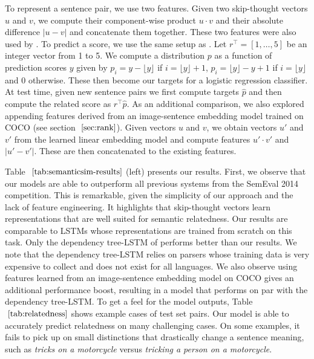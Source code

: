 \documentclass{article} \usepackage{nips15submit_e,times}
\begin{document}
To represent a sentence pair, we use two features. Given two skip-thought vectors $u$ and $v$, we compute their component-wise product $u \cdot v$ and their absolute difference $|u - v|$ and concatenate them together. These two features were also used by \cite{tai2015improved}. To predict a score, we use the same setup as \cite{tai2015improved}. Let $r^\top = [1,\ldots,5]$ be an integer vector from 1 to 5. We compute a distribution $p$ as a function of prediction scores $y$ given by $p_i = y - \lfloor y \rfloor$ if $i = \lfloor y \rfloor + 1$, $p_i = \lfloor y \rfloor - y + 1$ if $i = \lfloor y \rfloor$ and 0 otherwise. These then become our targets for a logistic regression classifier. At test time, given new sentence pairs we first compute targets $\hat{p}$ and then compute the related score as $r^\top \hat{p}$. As an additional comparison, we also explored appending features derived from an image-sentence embedding model trained on COCO (see section $~\ref{sec:rank}$). Given vectors $u$ and $v$, we obtain vectors $u'$ and $v'$ from the learned linear embedding model and compute features $u' \cdot v'$ and $|u' - v'|$. These are then concatenated to the existing features. 

Table $~\ref{tab:semanticsim-results}$ (left) presents our results. First, we observe that our models are able to outperform all previous systems from the SemEval 2014 competition. This is remarkable, given the simplicity of our approach and the lack of feature engineering. It highlights that skip-thought vectors learn representations that are well suited for semantic relatedness. Our results are comparable to LSTMs whose representations are trained from scratch on this task. Only the dependency tree-LSTM of \cite{tai2015improved} performs better than our results. We note that the dependency tree-LSTM relies on parsers whose training data is very expensive to collect and does not exist for all languages. We also observe using features learned from an image-sentence embedding model on COCO gives an additional performance boost, resulting in a model that performs on par with the dependency tree-LSTM. To get a feel for the model outputs, Table$~\ref{tab:relatedness}$ shows example cases of test set pairs. Our model is able to accurately predict relatedness on many challenging cases. On some examples, it fails to pick up on small distinctions that drastically change a sentence meaning, such as {\it tricks on a motorcycle} versus {\it tricking a person on a motorcycle}. 
\end{document}

